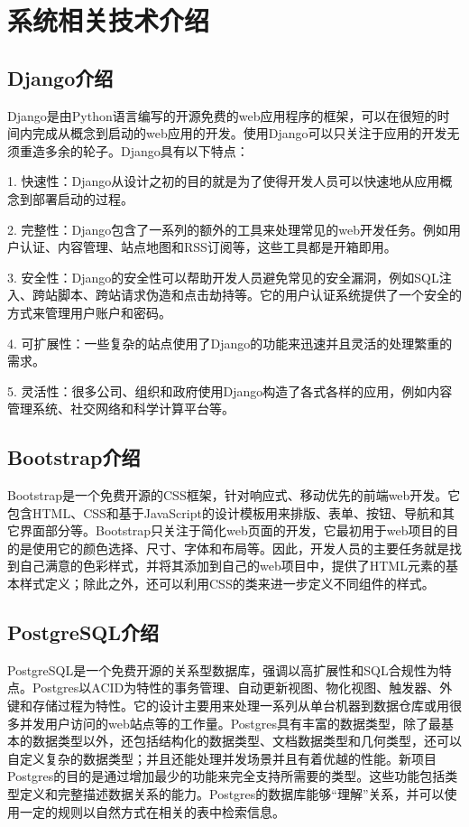 \section{系统相关技术介绍}

\subsection{Django介绍}

Django是由Python语言编写的开源免费的web应用程序的框架，可以在很短的时间内完成从概念到启动的web应用的开发。使用Django可以只关注于应用的开发无须重造多余的轮子。Django具有以下特点：

1. 快速性：Django从设计之初的目的就是为了使得开发人员可以快速地从应用概念到部署启动的过程。

2. 完整性：Django包含了一系列的额外的工具来处理常见的web开发任务。例如用户认证、内容管理、站点地图和RSS订阅等，这些工具都是开箱即用。

3. 安全性：Django的安全性可以帮助开发人员避免常见的安全漏洞，例如SQL注入、跨站脚本、跨站请求伪造和点击劫持等。它的用户认证系统提供了一个安全的方式来管理用户账户和密码。

4. 可扩展性：一些复杂的站点使用了Django的功能来迅速并且灵活的处理繁重的需求。

5. 灵活性：很多公司、组织和政府使用Django构造了各式各样的应用，例如内容管理系统、社交网络和科学计算平台等。

\subsection{Bootstrap介绍}

Bootstrap是一个免费开源的CSS框架，针对响应式、移动优先的前端web开发。它包含HTML、CSS和基于JavaScript的设计模板用来排版、表单、按钮、导航和其它界面部分等。Bootstrap只关注于简化web页面的开发，它最初用于web项目的目的是使用它的颜色选择、尺寸、字体和布局等。因此，开发人员的主要任务就是找到自己满意的色彩样式，并将其添加到自己的web项目中，提供了HTML元素的基本样式定义；除此之外，还可以利用CSS的类来进一步定义不同组件的样式。

\subsection{PostgreSQL介绍}

PostgreSQL是一个免费开源的关系型数据库，强调以高扩展性和SQL合规性为特点。Postgres以ACID为特性的事务管理、自动更新视图、物化视图、触发器、外键和存储过程为特性。它的设计主要用来处理一系列从单台机器到数据仓库或用很多并发用户访问的web站点等的工作量。Postgres具有丰富的数据类型，除了最基本的数据类型以外，还包括结构化的数据类型、文档数据类型和几何类型，还可以自定义复杂的数据类型；并且还能处理并发场景并且有着优越的性能。新项目Postgres的目的是通过增加最少的功能来完全支持所需要的类型。这些功能包括类型定义和完整描述数据关系的能力。Postgres的数据库能够“理解”关系，并可以使用一定的规则以自然方式在相关的表中检索信息。

